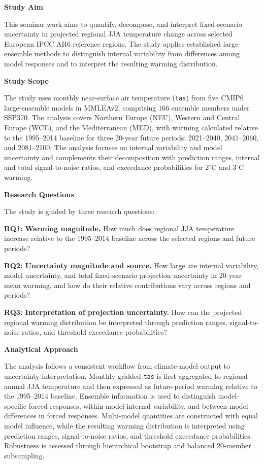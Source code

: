 \documentclass[
]{krantz}
\begin{document}
\textbf{Study Aim}

This seminar work aims to quantify, decompose, and interpret fixed-scenario uncertainty in projected regional JJA temperature change across selected European IPCC AR6 reference regions. The study applies established large-ensemble methods to distinguish internal variability from differences among model responses and to interpret the resulting warming distribution.

\textbf{Study Scope}

The study uses monthly near-surface air temperature (\texttt{tas}) from five CMIP6 large-ensemble models in MMLEAv2, comprising 166 ensemble members under SSP370. The analysis covers Northern Europe (NEU), Western and Central Europe (WCE), and the Mediterranean (MED), with warming calculated relative to the 1995--2014 baseline for three 20-year future periods: 2021--2040, 2041--2060, and 2081--2100. The analysis focuses on internal variability and model uncertainty and complements their decomposition with prediction ranges, internal and total signal-to-noise ratios, and exceedance probabilities for \(2^\circ\mathrm{C}\) and \(3^\circ\mathrm{C}\) warming.

\textbf{Research Questions}

The study is guided by three research questions:

\textbf{RQ1: Warming magnitude.} How much does regional JJA temperature increase relative to the 1995--2014 baseline across the selected regions and future periods?

\textbf{RQ2: Uncertainty magnitude and source.} How large are internal variability, model uncertainty, and total fixed-scenario projection uncertainty in 20-year mean warming, and how do their relative contributions vary across regions and periods?

\textbf{RQ3: Interpretation of projection uncertainty.} How can the projected regional warming distribution be interpreted through prediction ranges, signal-to-noise ratios, and threshold exceedance probabilities?

\textbf{Analytical Approach}

The analysis follows a consistent workflow from climate-model output to uncertainty interpretation. Monthly gridded \texttt{tas} is first aggregated to regional annual JJA temperature and then expressed as future-period warming relative to the 1995--2014 baseline. Ensemble information is used to distinguish model-specific forced responses, within-model internal variability, and between-model differences in forced responses. Multi-model quantities are constructed with equal model influence, while the resulting warming distribution is interpreted using prediction ranges, signal-to-noise ratios, and threshold exceedance probabilities. Robustness is assessed through hierarchical bootstrap and balanced 20-member subsampling.
\end{document}
